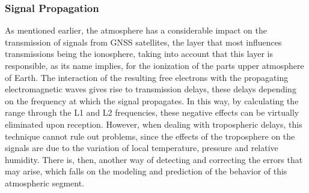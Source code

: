 



\subsubsection{Signal Propagation}\label{sec:II_gnss_comm_propag}

As mentioned earlier, the atmosphere has a considerable impact on the transmission of signals from GNSS satellites, the layer that most influences transmissions being the ionosphere, taking into account that this layer is responsible, as its name implies, for the ionization of the parts upper atmosphere of Earth. The interaction of the resulting free electrons with the propagating electromagnetic waves gives rise to transmission delays, these delays depending on the frequency at which the signal propagates. In this way, by calculating the range through the L1 and L2 frequencies, these negative effects can be virtually eliminated upon reception.
However, when dealing with tropospheric delays, this technique cannot rule out problems, since the effects of the troposphere on the signals are due to the variation of local temperature, pressure and relative humidity. There is, then, another way of detecting and correcting the errors that may arise, which falls on the modeling and prediction of the behavior of this atmospheric segment.

